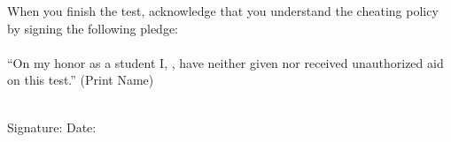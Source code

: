 \documentclass[12pt]{article}
\begin{document}
When you finish the test, acknowledge that
you understand the cheating policy by signing the following pledge:\\
\\
``On my honor as a student I,
\underline{\phantom{XXXXXXXXXXXXXXXX}}, have neither
given nor received unauthorized aid on this test.''
\hbox{} \hskip 1cm {\small (Print Name)}\\
\\
\begin{flushright} Signature: \underline{\phantom{XXXXXXXXXXXXXXXXXXXXXXXX}}
  Date: \underline{\phantom{XXXXXXXXXX}}
\end{flushright}
\end{document}
